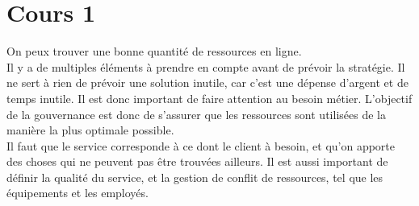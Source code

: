 \section{Cours 1}
On peux trouver une bonne quantit\'e de ressources en ligne.\\
Il y a de multiples \'el\'ements \`a prendre en compte avant de pr\'evoir la strat\'egie.
Il ne sert \`a rien de pr\'evoir une solution inutile, car c'est une d\'epense d'argent et de temps inutile.
Il est donc important de faire attention au besoin m\'etier.
L'objectif de la gouvernance est donc de s'assurer que les ressources sont utilis\'ees de la mani\`ere la plus optimale
possible.\\
Il faut que le service corresponde \`a ce dont le client \`a besoin, et qu'on apporte des choses qui ne peuvent pas
\^etre trouv\'ees ailleurs. Il est aussi important de d\'efinir la qualit\'e du service, et la gestion de conflit de
ressources, tel que les \'equipements et les employ\'es.
